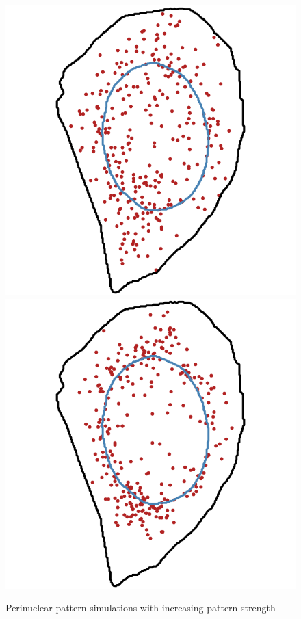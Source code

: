 \begin{figure}[h]
		\includegraphics[width=\linewidth]{figures/chapter4/simulation_perinuclear_50}
	\endminipage\hfill
		\includegraphics[width=\linewidth]{figures/chapter4/simulation_perinuclear_90}
	\endminipage
	\caption{Perinuclear pattern simulations with increasing pattern strength}
	\label{fig:perinuclear_panel}
\end{figure}

